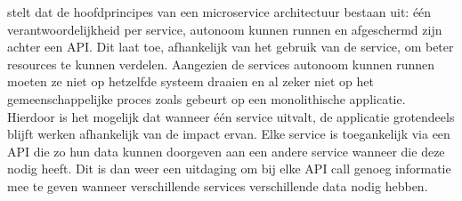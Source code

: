 \textcite{Blinowski2022} stelt dat de hoofdprincipes van een microservice architectuur bestaan uit: één verantwoordelijkheid per service, autonoom kunnen runnen en afgeschermd zijn achter een API. Dit laat toe, afhankelijk van het gebruik van de service, om beter resources te kunnen verdelen. Aangezien de services autonoom kunnen runnen moeten ze niet op hetzelfde systeem draaien en al zeker niet op het gemeenschappelijke proces zoals gebeurt op een monolithische applicatie\autocite{Dragoni2017}. Hierdoor is het mogelijk dat wanneer één service uitvalt, de applicatie grotendeels blijft werken afhankelijk van de impact ervan. Elke service is toegankelijk via een API die zo hun data kunnen doorgeven aan een andere service wanneer die deze nodig heeft. Dit is dan weer een uitdaging om bij elke API call genoeg informatie mee te geven wanneer verschillende services verschillende data nodig hebben.
%
%
%
%



